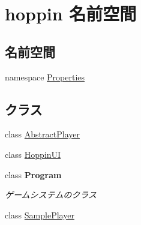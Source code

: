 \hypertarget{namespacehoppin}{}\section{hoppin 名前空間}
\label{namespacehoppin}
\subsection*{名前空間}
\begin{DoxyCompactItemize}
\item 
namespace \hyperlink{namespacehoppin_1_1_properties}{Properties}
\end{DoxyCompactItemize}
\subsection*{クラス}
\begin{DoxyCompactItemize}
\item 
class \hyperlink{classhoppin_1_1_abstract_player}{Abstract\+Player}
\item 
class \hyperlink{classhoppin_1_1_hoppin_u_i}{Hoppin\+UI}
\item 
class {\bfseries Program}
\begin{DoxyCompactList}\small\item\em ゲームシステムのクラス \end{DoxyCompactList}\item 
class \hyperlink{classhoppin_1_1_sample_player}{Sample\+Player}
\end{DoxyCompactItemize}
